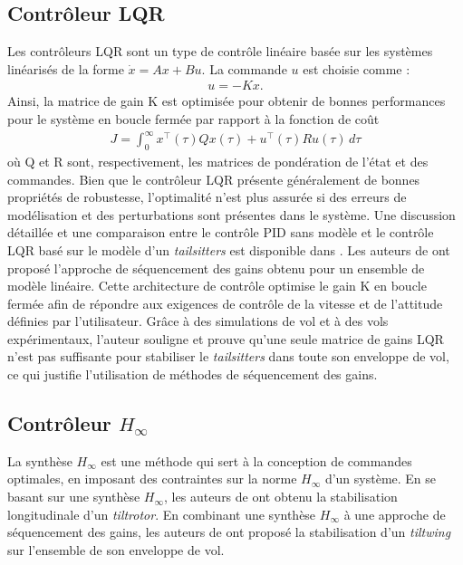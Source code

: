 \subsection*{Contrôleur LQR}
Les contrôleurs LQR sont un type de contrôle linéaire basée sur les systèmes linéarisés de la forme $\dot{x} = Ax+Bu$. La commande $u$ est
choisie comme :
\begin{align*}
    u = -Kx.
\end{align*}
Ainsi, la matrice de gain K est optimisée pour obtenir de bonnes performances pour le système en boucle fermée par rapport à la fonction de coût
\begin{align*}
    J = \int_{0}^{\infty} x^{\top}(\tau)Q x(\tau) + u^{\top}(\tau)R u(\tau) \,d\tau
\end{align*}
où Q et R sont, respectivement, les matrices de pondération de l'état et des commandes. Bien que le contrôleur LQR présente généralement de bonnes propriétés de robustesse, l'optimalité n'est plus assurée si des erreurs de modélisation et des perturbations sont présentes dans le système. Une discussion détaillée et une comparaison entre le contrôle PID sans modèle et le contrôle LQR basé sur le modèle d'un \textit{tailsitters} est disponible dans \cite{BarthCondomines2018}.
Les auteurs de \cite{Lustosa2017LaP} ont proposé l'approche de séquencement des gains obtenu pour un ensemble de modèle linéaire. Cette architecture de contrôle optimise le gain K en boucle fermée afin de répondre aux exigences de contrôle de la vitesse et de l'attitude définies par l'utilisateur. Grâce à des simulations de vol et à des vols expérimentaux, l'auteur souligne et prouve qu'une seule matrice de gains LQR n'est pas suffisante pour stabiliser le \textit{tailsitters} dans toute son enveloppe de vol, ce qui justifie l'utilisation de méthodes de séquencement des gains.

\subsection*{Contrôleur $H_{\infty}$}
La synthèse $H_{\infty}$ est une méthode qui sert à la conception de commandes optimales, en imposant des contraintes sur la norme $H_{\infty}$ d'un système. En se basant sur une synthèse $H_{\infty}$, les auteurs de \cite{SunYang2009} ont obtenu la stabilisation longitudinale d'un \textit{tiltrotor}. En combinant une synthèse $H_{\infty}$ à une approche de séquencement des gains, les auteurs de \cite{DickesonMix2005, DickesonCifdaloz2006,DickesonMiles2007} ont proposé la stabilisation d'un \textit{tiltwing} sur l'ensemble de son enveloppe de vol. 

